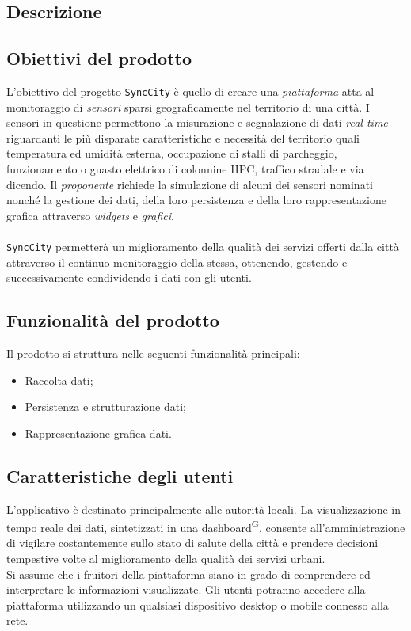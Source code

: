 \documentclass[8pt]{article}
\newcommand{\glossterm}[1]{#1\textsuperscript{G}} %
\begin{document}
\begin{itemize}
\section{Descrizione}
\subsection{Obiettivi del prodotto}
L'obiettivo del progetto \texttt{SyncCity} è quello di creare una \textit{piattaforma} atta al monitoraggio di \textit{sensori} sparsi geograficamente nel territorio di una città. I sensori in questione permettono la misurazione e segnalazione di dati \textit{real-time} riguardanti le più disparate caratteristiche e necessità del territorio quali temperatura ed umidità esterna, occupazione di stalli di parcheggio, funzionamento o guasto elettrico di colonnine HPC, traffico stradale e via dicendo. Il \textit{proponente} richiede la simulazione di alcuni dei sensori nominati nonché la gestione dei dati, della loro persistenza e della loro rappresentazione grafica attraverso \textit{widgets} e \textit{grafici}. \\\\\texttt{SyncCity} permetterà un miglioramento della qualità dei servizi offerti dalla città attraverso il continuo monitoraggio della stessa, ottenendo, gestendo e successivamente condividendo i dati con gli utenti. 
\subsection{Funzionalità del prodotto}
Il prodotto si struttura nelle seguenti funzionalità principali:
\begin{itemize}
	\setlength\itemsep{0em}
	\item Raccolta dati;
	\item Persistenza e strutturazione dati;
	\item Rappresentazione grafica dati.
\end{itemize}

\subsection{Caratteristiche degli utenti} \label{sec:users}
L'applicativo è destinato principalmente alle autorità locali. La visualizzazione in tempo reale dei dati, sintetizzati in una \glossterm{dashboard}, consente all'amministrazione di vigilare costantemente sullo stato di salute della città e prendere decisioni tempestive volte al miglioramento della qualità dei servizi urbani. \\ Si assume che i fruitori della piattaforma siano in grado di comprendere ed interpretare le informazioni visualizzate. Gli utenti potranno accedere alla piattaforma utilizzando un qualsiasi dispositivo desktop o mobile connesso alla rete.


\end{itemize}
\end{document}
